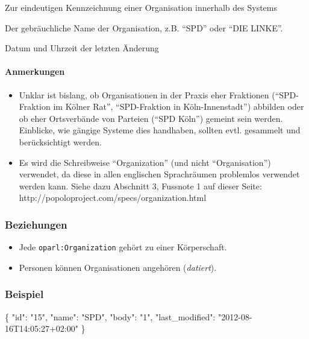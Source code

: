 \documentclass[,a4paper]{article}
\newenvironment{Shaded}{}{}
\newcommand{\DataTypeTok}[1]{\textcolor[rgb]{0.56,0.13,0.00}{{#1}}}
\newcommand{\StringTok}[1]{\textcolor[rgb]{0.25,0.44,0.63}{{#1}}}
\newcommand{\NormalTok}[1]{{#1}}
\begin{document}
\begin{description}
\itemsep1pt\parskip0pt
\item[Schlüssel (\texttt{id})]
Zur eindeutigen Kennzeichnung einer Organisation innerhalb des Systems
\item[Name (\texttt{name})]
Der gebräuchliche Name der Organisation, z.B. ``SPD'' oder ``DIE
LINKE''.
\item[Zuletzt geändert (\texttt{last\_modified})]
Datum und Uhrzeit der letzten Änderung
\end{description}

\paragraph{Anmerkungen}\label{anmerkungen-1}

\begin{itemize}
\item
  Unklar ist bislang, ob Organisationen in der Praxis eher Fraktionen
  (``SPD-Fraktion im Kölner Rat'', ``SPD-Fraktion in Köln-Innenstadt'')
  abbilden oder ob eher Ortsverbände von Parteien (``SPD Köln'') gemeint
  sein werden. Einblicke, wie gängige Systeme dies handhaben, sollten
  evtl. gesammelt und berücksichtigt werden.
\item
  Es wird die Schreibweise ``Organization'' (und nicht ``Organisation'')
  verwendet, da diese in allen englischen Sprachräumen problemlos
  verwendet werden kann. Siehe dazu Abschnitt 3, Fussnote 1 auf dieser
  Seite: http://popoloproject.com/specs/organization.html
\end{itemize}

\subsubsection{Beziehungen}\label{beziehungen-2}

\begin{itemize}
\itemsep1pt\parskip0pt
\item
  Jede \texttt{oparl:Organization} gehört zu einer Körperschaft.
\item
  Personen können Organisationen angehören (\emph{datiert}).
\end{itemize}

\subsubsection{Beispiel}\label{beispiel-3}

\begin{Shaded}
\begin{Highlighting}[]
\NormalTok{\{}
    \DataTypeTok{"id"}\NormalTok{: }\StringTok{"15"}\NormalTok{,}
    \DataTypeTok{"name"}\NormalTok{: }\StringTok{"SPD"}\NormalTok{,}
    \DataTypeTok{"body"}\NormalTok{: }\StringTok{"1"}\NormalTok{,}
    \DataTypeTok{"last_modified"}\NormalTok{: }\StringTok{"2012-08-16T14:05:27+02:00"}
\NormalTok{\}}
\end{Highlighting}
\end{Shaded}
\end{document}
